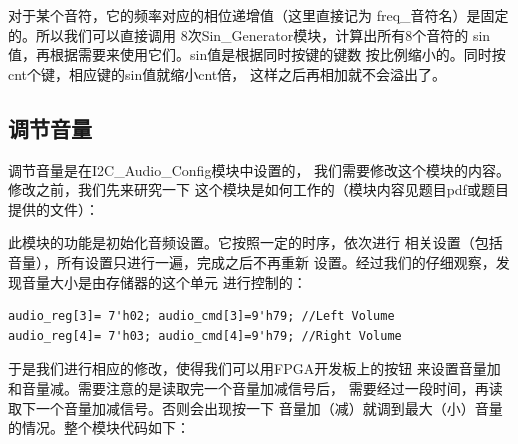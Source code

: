 \documentclass[12pt,a4paper,UTF8]{article}
\begin{document}
对于某个音符，它的频率对应的相位递增值（这里直接记为
\mbox{freq\_音符名}）是固定的。所以我们可以直接调用
8次\mbox{Sin\_Generator}模块，计算出所有8个音符的
sin值，再根据需要来使用它们。sin值是根据同时按键的键数
按比例缩小的。同时按cnt个键，相应键的sin值就缩小cnt倍，
这样之后再相加就不会溢出了。

\subsection{调节音量}
调节音量是在\mbox{I2C\_Audio\_Config}模块中设置的，
我们需要修改这个模块的内容。修改之前，我们先来研究一下
这个模块是如何工作的（模块内容见题目pdf或题目提供的文件）：

此模块的功能是初始化音频设置。它按照一定的时序，依次进行
相关设置（包括音量），所有设置只进行一遍，完成之后不再重新
设置。经过我们的仔细观察，发现音量大小是由存储器的这个单元
进行控制的：

\begin{lstlisting}[style=verilog-style]
audio_reg[3]= 7'h02; audio_cmd[3]=9'h79; //Left Volume
audio_reg[4]= 7'h03; audio_cmd[4]=9'h79; //Right Volume
\end{lstlisting}

于是我们进行相应的修改，使得我们可以用FPGA开发板上的按钮
来设置音量加和音量减。需要注意的是读取完一个音量加减信号后，
需要经过一段时间，再读取下一个音量加减信号。否则会出现按一下
音量加（减）就调到最大（小）音量的情况。整个模块代码如下：
\end{document}
